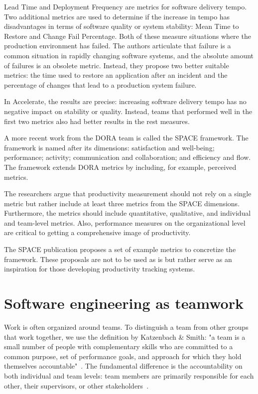 Lead Time and Deployment Frequency are metrics for software delivery tempo. Two additional metrics are used to determine if the increase in tempo has disadvantages in terms of software quality or system stability: Mean Time to Restore and Change Fail Percentage. Both of these measure situations where the production environment has failed. The authors articulate that failure is a common situation in rapidly changing software systems, and the absolute amount of failures is an obsolete metric. Instead, they propose two better suitable metrics: the time used to restore an application after an incident and the percentage of changes that lead to a production system failure. 

In Accelerate, the results are precise: increasing software delivery tempo has no negative impact on stability or quality. Instead, teams that performed well in the first two metrics also had better results in the rest measures. 

A more recent work from the DORA team is called the SPACE framework. The framework is named after its dimensions: satisfaction and well-being; performance; activity; communication and collaboration; and efficiency and flow. The framework extends DORA metrics by including, for example, perceived metrics. 

The researchers argue that productivity measurement should not rely on a single metric but rather include at least three metrics from the SPACE dimensions. Furthermore, the metrics should include quantitative, qualitative, and individual and team-level metrics. Also, performance measures on the organizational level are critical to getting a comprehensive image of productivity. 

The SPACE publication proposes a set of example metrics to concretize the framework. These proposals are not to be used as is but rather serve as an inspiration for those developing productivity tracking systems.~\cite{forsgren_space_2021}

\section{Software engineering as teamwork}

Work is often organized around teams. To distinguish a team from other groups that work together, we use the definition by Katzenbach \& Smith: "a team is a small number of people with complementary skills who are committed to a common purpose, set of performance goals, and approach for which they hold themselves accountable"~\cite{katzenbach_discipline_1993}. The fundamental difference is the accountability on both individual and team levels: team members are primarily responsible for each other, their supervisors, or other stakeholders~\cite{katzenbach_discipline_1993}.

